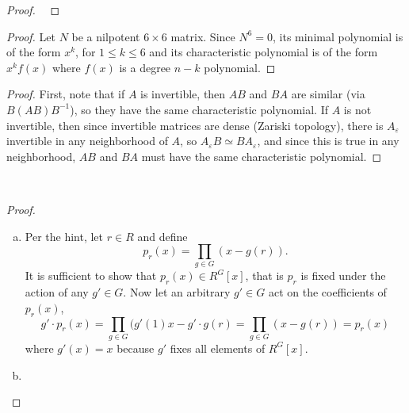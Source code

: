 \documentclass{article}
\newenvironment{problem}[2][Problem]{\begin{trivlist}
\item[\hskip \labelsep {\bfseries #1}\hskip \labelsep {\bfseries #2.}]}{\end{trivlist}}
\begin{document}
\begin{proof} ~
\end{proof}
\pagebreak
\begin{problem}{8.39 (Rotman)} %
\end{problem}

\begin{proof}
  Let $N$ be a nilpotent $6 \times 6$ matrix.
  Since $N^6 = 0$, its minimal polynomial is of the form $x^k$, for $1 \leq k \leq 6$
  and its characteristic polynomial is of the form $x^k f(x)$ where $f(x)$ is a degree $n-k$ polynomial.
\end{proof}
\pagebreak
\begin{problem}{1} %
\end{problem}

\begin{proof}
  First, note that if $A$ is invertible, then $AB$ and $BA$ are similar
  (via $B(AB)B^{-1}$), so they have the same characteristic polynomial.
  If $A$ is not invertible, then since invertible matrices are dense
  (Zariski topology), there is $A_\varepsilon$ invertible in any neighborhood of
  $A$, so $A_\varepsilon B \simeq BA_\varepsilon$,
  and since this is true in any neighborhood, $AB$ and $BA$ must have
  the same characteristic polynomial.
\end{proof}
\pagebreak
\begin{problem}{2} ~
\end{problem}

\begin{proof} ~
  \begin{enumerate}[(a)]
    \item Per the hint, let $r \in R$ and define  \[
      p_r(x) = \prod_{g\in G} (x - g(r)).
    \] It is sufficient to show that $p_r(x) \in R^G[x]$, that is $p_r$ is fixed
    under the action of any $g' \in G$. Now let an arbitrary $g' \in G$ act on the
    coefficients of $p_r(x)$, \[
      g' \cdot p_r(x) = \prod_{g\in G} (g'(1)x - g'\cdot g(r) = \prod_{g\in G} (x - g(r)) = p_r(x)
    \] where $g'(x) = x$ because $g'$ fixes all elements of $R^G[x]$.
    \item
  \end{enumerate}
\end{proof}
\pagebreak
\begin{problem}{3}
\end{problem}
\end{document}
